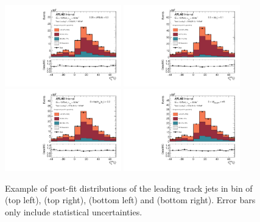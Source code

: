\begin{figure}[htbp]
  \centering
 \includegraphics[width=0.45\textwidth]{figures/gbb/paperplots/Canv_Fit_dR_LpT_INF_SpT_INF_coarse_x}
 \includegraphics[width=0.45\textwidth]{figures/gbb/paperplots/Canv_Fit_zpt_LpT_INF_SpT_INF_coarse_x}  
 \includegraphics[width=0.45\textwidth]{figures/gbb/paperplots/Canv_Fit_M_LpT_INF_SpT_INF_coarse_x}
 \includegraphics[width=0.45\textwidth]{figures/gbb/paperplots/Canv_Fit_dphi_LpT_INF_SpT_INF_coarse_x}
\caption{Example of post-fit \subsdzero distributions of the leading track jets in bin of \drbb (top left), \zpt (top right), \mpt (bottom left) and \dphi (bottom right). Error bars only include statistical uncertainties.}
  \label{fig:fit-example-leading}
\end{figure}



